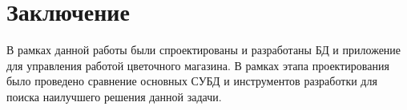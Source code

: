 \section*{Заключение}
%

В рамках данной работы были спроектированы и разработаны БД и приложение для управления работой цветочного магазина. В рамках этапа проектирования было проведено сравнение основных СУБД и инструментов разработки для поиска наилучшего решения данной задачи.
